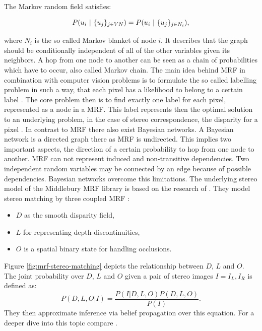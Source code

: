 \noindent The Markov random field satisfies:

\begin{equation}
  P(u_i\ |\ \{u_j\}_{j \in V\\N}) = P(u_i\ |\ \{u_j\}_{j \in N_i}),
\end{equation}

\noindent where $N_i$ is the so called Markov blanket of node $i$.
It describes that the graph should be conditionally independent of all of the other variables given its neighbors.
A hop from one node to another can be seen as a chain of probabilities which have to occur, also called Markov chain.
The main idea behind MRF in combination with computer vision problems is to formulate the so called labelling problem in such a way, that each pixel has a likelihood to belong to a certain label \citep{tamassia2013handbook}.
The core problem then is to find exactly one label for each pixel, represented as a node in a MRF.
This label represents then the optimal solution to an underlying problem, in the case of stereo correspondence, the disparity for a pixel \citep{cyganek2011introduction}.
\newline\newline\noindent In contrast to MRF there also exist Bayesian networks.
A Bayesian network is a directed graph there as MRF is undirected.
This implies two important aspects, the direction of a certain probability to hop from one node to another.
MRF can not represent induced and non-transitive dependencies.
Two independent random variables may be connected by an edge because of possible dependencies.
Bayesian networks overcome this limitations.
\newline\newline\noindent The underlying stereo model of the Middlebury MRF library is based on the research of \citeauthor{sun2003stereo}.
They model stereo matching by three coupled MRF \citep{sun2003stereo}:
\begin{itemize}
  \item $D$ as the smooth disparity field,
  \item $L$ for representing depth-discontinuities,
  \item $O$ is a spatial binary state for handling occlusions.
\end{itemize}
\noindent Figure \ref{fig:mrf-stereo-matching} depicts the relationship between $D$, $L$ and $O$.
The joint probability over $D$, $L$ and $O$ given a pair of stereo images $I = {I_L,I_R}$ is defined as:
\begin{equation}
  P(D,L,O|I) = \frac{P(I|D,L,O)P(D,L,O)}{P(I)}.
\end{equation}
They then approximate inference via belief propagation over this equation.
For a deeper dive into this topic compare \citep{sun2003stereo, tamassia2013handbook, cyganek2011introduction, yedidia2003understanding, boykov2001fast, kolmogorov2006convergent, wainwright2005map}.

